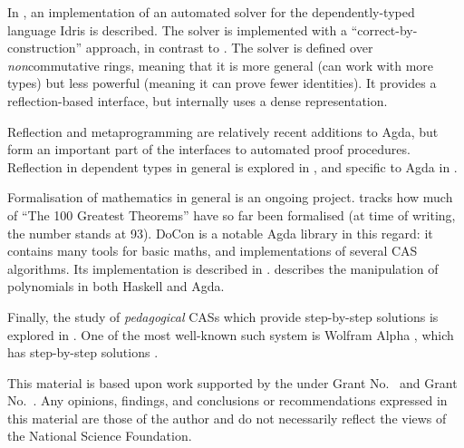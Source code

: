 \documentclass[acmsmall,review,anonymous]{acmart}\settopmatter{printfolios=true,printccs=false,printacmref=false}
\theoremstyle{remark}
\begin{document}
In \citet{geuvers_automatically_2017}, an implementation of an automated solver
for the dependently-typed language Idris \cite{brady_idris_2013} is described.
The solver is implemented with a ``correct-by-construction'' approach, in
contrast to \citet{gregoire_proving_2005}. The solver is defined over
\emph{non}commutative rings, meaning that it is more general (can work with more
types) but less powerful (meaning it can prove fewer identities). It provides a
reflection-based interface, but internally uses a dense representation.

Reflection and metaprogramming are relatively recent additions to Agda, but form
an important part of the interfaces to automated proof procedures. Reflection in
dependent types in general is explored in \citet{christiansen_practical_2015},
and specific to Agda in \citet{van_der_walt_reflection_2012}.

Formalisation of mathematics in general is an ongoing project.
\citet{wiedijk_formalizing_2018} tracks how much of ``The 100 Greatest Theorems''
\cite{kahl_hundred_2004} have so far been formalised (at time of writing, the
number stands at 93). DoCon \cite{meshveliani_docon-provable_2018} is a notable
Agda library in this regard: it contains many tools for basic maths, and
implementations of several CAS algorithms. Its implementation is described
in \citet{meshveliani_dependent_2013}. \citet{cheng_functional_2018} describes the
manipulation of polynomials in both Haskell and Agda.

Finally, the study of \emph{pedagogical} CASs which provide step-by-step
solutions is explored in \citet{lioubartsev_constructing_2016}. One of the most
well-known such system is Wolfram Alpha
\cite{wolfram_research_inc._wolframalpha_2019}, which has step-by-step solutions
\cite{the_development_team_step-by-step_2009}.

\begin{acks}                            %
  This material is based upon work supported by the
   under Grant
  No.~ and Grant
  No.~.  Any opinions, findings, and
  conclusions or recommendations expressed in this material are those
  of the author and do not necessarily reflect the views of the
  National Science Foundation.
\end{acks}




\end{document}
